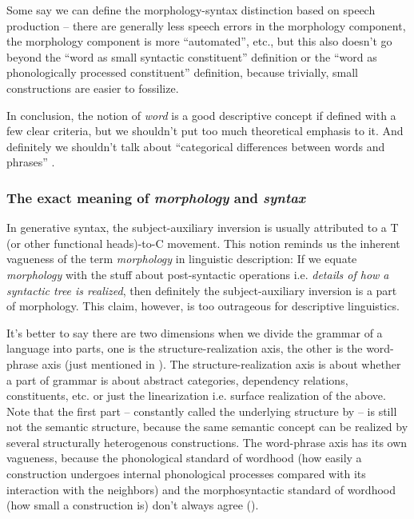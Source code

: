 \documentclass[UTF8, a4paper, oneside, scheme=plain]{ctexrep}
\newcommand*{\term}[1]{\emph{#1}}
\begin{document}
Some say we can define the morphology-syntax distinction based on speech production -- 
there are generally less speech errors in the morphology component,
the morphology component is more ``automated'', etc.,
but this also doesn't go beyond the ``word as small syntactic constituent'' definition 
or the ``word as phonologically processed constituent'' definition,
because trivially, small constructions are easier to fossilize.

In conclusion, the notion of \term{word} is a good descriptive concept
if defined with a few clear criteria,
but we shouldn't put too much theoretical emphasis to it.
And definitely we shouldn't talk about ``categorical differences between words and phrases'' 
\citep{bruening2018lexicalist}.

\subsubsection{The exact meaning of \term{morphology} and \term{syntax}}\label{sec:morphology-meaning}

In generative syntax, the subject-auxiliary inversion is usually attributed to 
a T (or other functional heads)-to-C movement.
This notion reminds us the inherent vagueness of the term \term{morphology} in linguistic description:
If we equate \term{morphology} with the stuff about post-syntactic operations 
i.e. \emph{details of how a syntactic tree is realized},
then definitely the subject-auxiliary inversion is a part of morphology.
This claim, however, is too outrageous for descriptive linguistics.

It's better to say there are two dimensions 
when we divide the grammar of a language into parts,
one is the structure-realization axis,
the other is the word-phrase axis
(just mentioned in ).
The structure-realization axis is about 
whether a part of grammar is about abstract categories, dependency relations, constituents, etc. 
or just the linearization i.e. surface realization of the above.
Note that the first part -- constantly called the underlying structure by \citet{dixon2009basic1} 
-- is still not the semantic structure,
because the same semantic concept can be realized by several structurally heterogenous constructions.
The word-phrase axis has its own vagueness,
because the phonological standard of wordhood 
(how easily a construction undergoes internal phonological processes 
compared with its interaction with the neighbors)
and the morphosyntactic standard of wordhood 
(how small a construction is)
don't always agree ().
\end{document}
